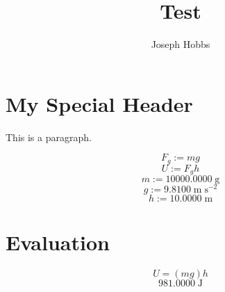 \documentclass[12pt]{article}
\begin{document}
\title{\textbf{Test}}
\author{Joseph Hobbs}
\maketitle
\tableofcontents


\section{My Special Header}




This is a paragraph.\par


$$
F_{g} := m g
$$
$$
U := F_{g} h
$$
$$
m := 10000.0000 \; \mathrm{g}
$$
$$
g := 9.8100 \; \mathrm{m} \; \mathrm{s^{-2}}
$$
$$
h := 10.0000 \; \mathrm{m}
$$


\section{Evaluation}


$$
U = (m g) h
$$
$$
981.0000 \; \mathrm{J}
$$
\end{document}
